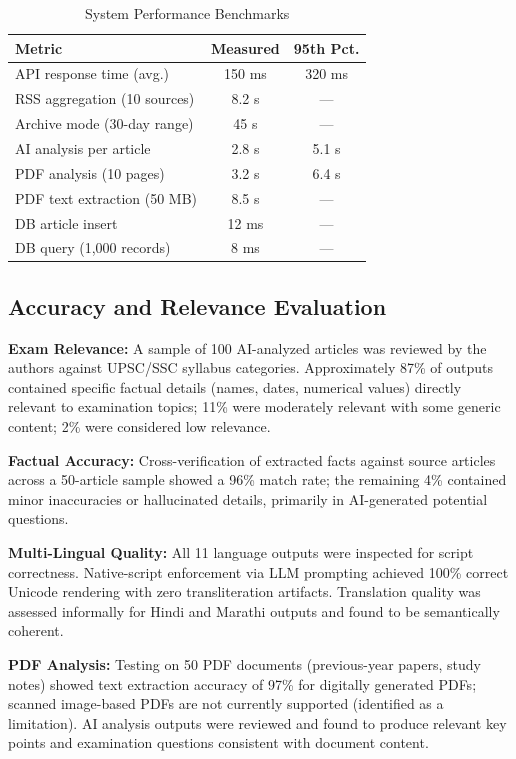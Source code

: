 \documentclass[conference]{IEEEtran}
\begin{document}
\begin{table}[!t]
\renewcommand{\arraystretch}{1.2}
\caption{System Performance Benchmarks}
\label{tab:perf}
\centering
\small
\begin{tabular}{@{}lcc@{}}
\toprule
\textbf{Metric} & \textbf{Measured} & \textbf{95th Pct.} \\
\midrule
API response time (avg.)     & 150 ms  & 320 ms \\
RSS aggregation (10 sources) & 8.2 s   & ---    \\
Archive mode (30-day range)  & 45 s    & ---    \\
AI analysis per article      & 2.8 s   & 5.1 s  \\
PDF analysis (10 pages)      & 3.2 s   & 6.4 s  \\
PDF text extraction (50 MB)  & 8.5 s   & ---    \\
DB article insert            & 12 ms   & ---    \\
DB query (1{,}000 records)   & 8 ms    & ---    \\
\bottomrule
\end{tabular}
\end{table}

\subsection{Accuracy and Relevance Evaluation}
\textbf{Exam Relevance:} A sample of 100 AI-analyzed articles was reviewed by the authors against UPSC/SSC syllabus categories. Approximately 87\% of outputs contained specific factual details (names, dates, numerical values) directly relevant to examination topics; 11\% were moderately relevant with some generic content; 2\% were considered low relevance.

\textbf{Factual Accuracy:} Cross-verification of extracted facts against source articles across a 50-article sample showed a 96\% match rate; the remaining 4\% contained minor inaccuracies or hallucinated details, primarily in AI-generated potential questions.

\textbf{Multi-Lingual Quality:} All 11 language outputs were inspected for script correctness. Native-script enforcement via LLM prompting achieved 100\% correct Unicode rendering with zero transliteration artifacts. Translation quality was assessed informally for Hindi and Marathi outputs and found to be semantically coherent.

\textbf{PDF Analysis:} Testing on 50 PDF documents (previous-year papers, study notes) showed text extraction accuracy of 97\% for digitally generated PDFs; scanned image-based PDFs are not currently supported (identified as a limitation). AI analysis outputs were reviewed and found to produce relevant key points and examination questions consistent with document content.
\end{document}
